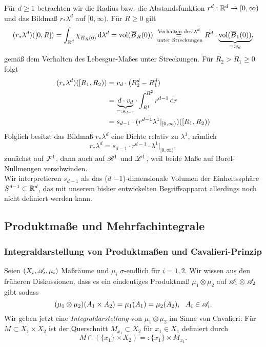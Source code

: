\begin{example}
Für $d\geq 1$ betrachten wir die Radius bzw. die Abstandsfunktion $r^d:\R^d\to[0,\infty)$ und das Bildmaß $r_*\lambda^d$ auf $[0,\infty)$. Für $R\geq 0$ gilt
\begin{equation*}
\begin{split}
(r_*\lambda^d)([0,R]) = \int_{\R^d}\chi_{\ol{B}_R(0)}\D\lambda^d = \vol (\ol{B}_R(0)) \underset{ \te{ unter Streckungen}}{\overset{\te{Verhalten des }\lambda^d}=} R^d \cdot \underbrace{\vol (\ol{B}_1(0))}_{=:v_d},
\end{split}
\end{equation*}
gemäß dem Verhalten des Lebesgue-Maßes unter Streckungen. Für $R_2>R_1\geq 0$ folgt
\begin{equation*}
\begin{split}
(r_*\lambda^d)([R_1,R_2))&=v_d \cdot (R_2^d-R_1^d) \\ &= \underbrace{d\cdot v_d}_{=:s_{d-1}} \cdot \int_{R^1}^{R^2}r^{d-1}\D r \\ &= s_{d-1}\cdot (r^{d-1} \lambda^1|_{[0,\infty)})([R_1,R_2))
\end{split}
\end{equation*}
Folglich besitzt das Bildmaß $r_*\lambda^d$ eine Dichte relativ zu $\lambda^1$, nämlich
\begin{equation}\label{r*vd}
r_* \lambda^d = s_{d-1} \cdot r^{d-1} \cdot \lambda^1|_{[0,\infty)},
\end{equation}
zunächst auf $\FF^1$, dann auch auf $\BB^1$ und $\LL^1$, weil beide Maße auf Borel-Nullmengen verschwinden. \vspace{0.3pc}\\
Wir interpretieren $s_{d-1}$ als das ($d$%
$-$1)-dimensionale Volumen der Einheitssphäre $S^{d-1}\subset\R^d$, das mit unserem bisher entwickelten Begriffsapparat allerdings noch nicht definiert werden kann.
\end{example}

\subsection{Produktmaße und Mehrfachintegrale}
\subsubsection{Integraldarstellung von Produktmaßen und Cavalieri-Prinzip}
Seien $(X_i,\AA_i,\mu_i)$ Maßräume und $\mu_i$ $\sigma$-endlich für $i=1,2$. Wir wissen aus den früheren Diskussionen, dass es ein eindeutiges Produktmaß $\mu_1\otimes \mu_2$ auf $\AA_1 \otimes \AA_2$ gibt sodass
$$(\mu_1\otimes\mu_2)(A_1\times A_2) =\mu_1(A_1)=\mu_2(A_2), \ \ A_i \in \AA_i.$$
Wir geben jetzt eine \emph{Integraldarstellung} von $\mu_1\otimes \mu_2$ im Sinne von Cavalieri: Für $M\subset X_1 \times X_2$ ist der Querschnitt $M_{x_1}\subset X_2$ für $x_1\in X_1$  definiert durch
$$M\cap (\{x_1\}\times X_2) =: \{x_1\} \times M_{x_1}.$$

